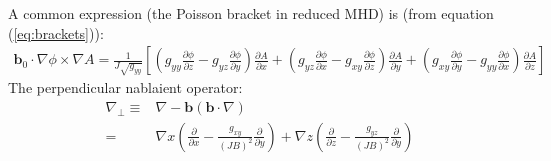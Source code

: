 \documentclass[12pt]{article}
\def\L{\left}
\def\R{\right}
\newcommand{\deriv}[2]{\ensuremath{\frac{\partial #1}{\partial #2}}}
\newcommand{\ve}[1]{\ensuremath{\boldsymbol{#1}}}
\newcommand{\bvec}{\ve{b}}
\begin{document}
%
A common expression (the Poisson bracket in reduced MHD) is (from equation 
(\ref{eq:brackets})):
%
\begin{align*}
\bvec_0\cdot\nabla\phi\times\nabla A =
\frac{1}{J\sqrt{g_{yy}}}\L[\L(g_{yy}\deriv{\phi}{z} -
    g_{yz}\deriv{\phi}{y}\R)\deriv{A}{x} + \L(g_{yz}\deriv{\phi}{x} -
    g_{xy}\deriv{\phi}{z}\R)\deriv{A}{y} + \L(g_{xy}\deriv{\phi}{y} -
g_{yy}\deriv{\phi}{x}\R)\deriv{A}{z}\R]
\end{align*}
%
The perpendicular nablaient operator:
%
\begin{align*}
\nabla_\perp \equiv& \nabla - \ve{b}\L(\ve{b}\cdot\nabla\R) \\ =& \nabla
    x\L(\deriv{}{x} - \frac{g_{xy}}{\L(JB\R)^2}\deriv{}{y}\R) +
    \nabla z\L(\deriv{}{z} -
    \frac{g_{yz}}{\L(JB\R)^2}\deriv{}{y}\R)
\end{align*}
%
\end{document}
